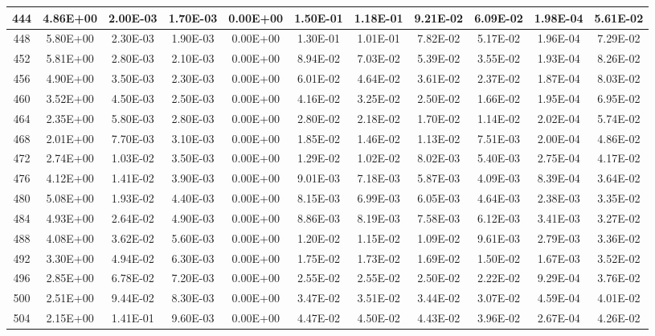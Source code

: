 \begin{landscape}
\begin{longtable}{c||c|c|c|c|c|c|c|c|c|c}
        444 & 4.86E+00 & 2.00E-03 & 1.70E-03 & 0.00E+00 & 1.50E-01 & 1.18E-01 & 9.21E-02 & 6.09E-02 & 1.98E-04 & 5.61E-02 \\ \hline
        448 & 5.80E+00 & 2.30E-03 & 1.90E-03 & 0.00E+00 & 1.30E-01 & 1.01E-01 & 7.82E-02 & 5.17E-02 & 1.96E-04 & 7.29E-02 \\ \hline
        452 & 5.81E+00 & 2.80E-03 & 2.10E-03 & 0.00E+00 & 8.94E-02 & 7.03E-02 & 5.39E-02 & 3.55E-02 & 1.93E-04 & 8.26E-02 \\ \hline
        456 & 4.90E+00 & 3.50E-03 & 2.30E-03 & 0.00E+00 & 6.01E-02 & 4.64E-02 & 3.61E-02 & 2.37E-02 & 1.87E-04 & 8.03E-02 \\ \hline
        460 & 3.52E+00 & 4.50E-03 & 2.50E-03 & 0.00E+00 & 4.16E-02 & 3.25E-02 & 2.50E-02 & 1.66E-02 & 1.95E-04 & 6.95E-02 \\ \hline
        464 & 2.35E+00 & 5.80E-03 & 2.80E-03 & 0.00E+00 & 2.80E-02 & 2.18E-02 & 1.70E-02 & 1.14E-02 & 2.02E-04 & 5.74E-02 \\ \hline
        468 & 2.01E+00 & 7.70E-03 & 3.10E-03 & 0.00E+00 & 1.85E-02 & 1.46E-02 & 1.13E-02 & 7.51E-03 & 2.00E-04 & 4.86E-02 \\ \hline
        472 & 2.74E+00 & 1.03E-02 & 3.50E-03 & 0.00E+00 & 1.29E-02 & 1.02E-02 & 8.02E-03 & 5.40E-03 & 2.75E-04 & 4.17E-02 \\ \hline
        476 & 4.12E+00 & 1.41E-02 & 3.90E-03 & 0.00E+00 & 9.01E-03 & 7.18E-03 & 5.87E-03 & 4.09E-03 & 8.39E-04 & 3.64E-02 \\ \hline
        480 & 5.08E+00 & 1.93E-02 & 4.40E-03 & 0.00E+00 & 8.15E-03 & 6.99E-03 & 6.05E-03 & 4.64E-03 & 2.38E-03 & 3.35E-02 \\ \hline
        484 & 4.93E+00 & 2.64E-02 & 4.90E-03 & 0.00E+00 & 8.86E-03 & 8.19E-03 & 7.58E-03 & 6.12E-03 & 3.41E-03 & 3.27E-02 \\ \hline
        488 & 4.08E+00 & 3.62E-02 & 5.60E-03 & 0.00E+00 & 1.20E-02 & 1.15E-02 & 1.09E-02 & 9.61E-03 & 2.79E-03 & 3.36E-02 \\ \hline
        492 & 3.30E+00 & 4.94E-02 & 6.30E-03 & 0.00E+00 & 1.75E-02 & 1.73E-02 & 1.69E-02 & 1.50E-02 & 1.67E-03 & 3.52E-02 \\ \hline
        496 & 2.85E+00 & 6.78E-02 & 7.20E-03 & 0.00E+00 & 2.55E-02 & 2.55E-02 & 2.50E-02 & 2.22E-02 & 9.29E-04 & 3.76E-02 \\ \hline
        500 & 2.51E+00 & 9.44E-02 & 8.30E-03 & 0.00E+00 & 3.47E-02 & 3.51E-02 & 3.44E-02 & 3.07E-02 & 4.59E-04 & 4.01E-02 \\ \hline
        504 & 2.15E+00 & 1.41E-01 & 9.60E-03 & 0.00E+00 & 4.47E-02 & 4.50E-02 & 4.43E-02 & 3.96E-02 & 2.67E-04 & 4.26E-02 \\ \hline

\end{longtable}
\end{landscape}
